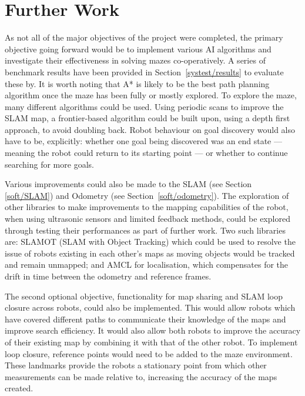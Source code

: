 
\chapter{Further Work}\label{furtherwork}
As not all of the major objectives of the project were completed, the primary objective going forward would be to implement various AI algorithms and investigate 
their effectiveness in solving mazes co-operatively.  A series of benchmark 
results have been provided in Section~\ref{systest/results} to evaluate 
these by. It is worth noting that A* is likely to be the best path planning 
algorithm once the maze has been fully or mostly explored. To 
explore the maze, many different algorithms could be used. Using periodic scans
to improve the SLAM map, a frontier-based algorithm could be built upon, using a 
depth first approach, to avoid doubling back. 
Robot behaviour on goal discovery would also have to be, explicitly: whether 
one goal being discovered was an end state --- meaning the robot could return 
to its starting point --- or whether to continue searching for more goals.
  
Various improvements could also be made to the SLAM (see Section~
\ref{soft/SLAM}) and Odometry (see Section~\ref{soft/odometry}).  
The exploration of other libraries to make improvements to the mapping 
capabilities of the robot, when using ultrasonic sensors and limited feedback 
methods, could be explored through testing their performances as part of
further work. Two such libraries are: SLAMOT (SLAM with Object Tracking) which 
could be used to resolve the issue of robots existing in each other's maps as 
moving objects would be tracked and remain unmapped; and AMCL for
localisation, which compensates for the drift in time between the odometry and 
reference frames.   

The second optional objective, functionality for map sharing and SLAM loop 
closure across robots, could also be implemented. This would allow robots which 
have covered different paths to communicate their knowledge of the maps and 
improve search efficiency. It would also allow both robots to improve the 
accuracy of their existing map by combining it with that of the other robot.
To implement loop closure, reference points would need to be added
to the maze environment. These landmarks provide the robots a stationary point 
from which other measurements can be made relative to, increasing the accuracy 
of the maps created.

